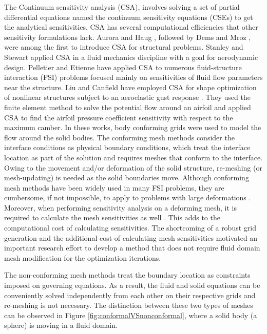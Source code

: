 \documentclass[12pt]{aiaa-pretty}
\begin{document}
The Continuum sensitivity analysis (CSA), involves solving a set of partial differential equations named the continuum sensitivity equations (CSEs) to get the analytical sensitivities. CSA has several computational efficiencies that other sensitivity formulations lack. Aurora and Haug \cite{Arora}, followed by Dems and Mroz \cite{Dems-Mroz}, were among the first to introduce CSA for structural problems. Stanley and Stewart \cite{stanley2002design} applied CSA in a fluid mechanics discipline with a goal for aerodynamic design. Pelletier and Etienne have applied CSA to numerous fluid-structure interaction (FSI) problems \cite{etienne2005general} focused mainly on sensitivities of fluid flow parameters near the structure. Liu and Canfield have employed CSA for shape optimization of nonlinear structures subject to an aeroelastic gust response \cite{liu2013equivalence}. They used the finite element method to solve the potential flow around an airfoil and applied CSA to find the airfoil pressure coefficient sensitivity with respect to the maximum camber. In these works, body conforming grids were used to model the flow around the solid bodies. The conforming mesh methods consider the interface conditions as physical boundary conditions, which treat the interface location as part of the solution and requires meshes that conform to the interface. Owing to the movement and/or deformation of the solid structure, re-meshing (or mesh-updating) is needed as the solid boundaries move. Although conforming mesh methods have been widely used in many FSI problems, they are cumbersome, if not impossible, to apply to problems with large deformations \cite{sahin2009arbitrary}. Moreover, when performing sensitivity analysis on a deforming mesh, it is required to calculate the mesh sensitivities as well \cite{liu2013boundary}. This adds to the computational cost of calculating  sensitivities. The shortcoming of a robust grid generation and the additional cost of calculating mesh sensitivities motivated an important research effort to develop a method that does not require fluid domain mesh modification for the optimization iterations.

The non-conforming mesh methods treat the boundary location as constraints imposed on governing equations. As a result, the fluid and solid equations can be conveniently solved independently from each other on their respective grids and re-meshing is not necessary. The distinction between these two types of meshes can be observed in Figure \ref{fig:conformalVSnonconformal}, where a solid body (a sphere) is moving in a fluid domain.
\end{document}
